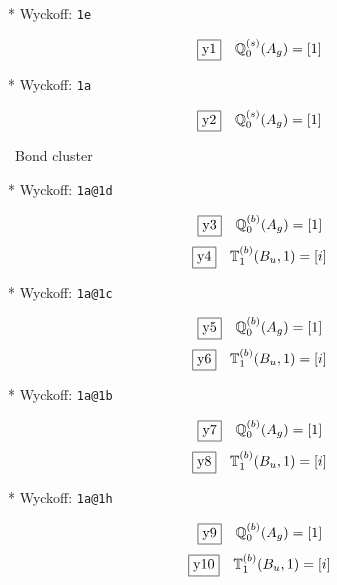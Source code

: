 \documentclass[fleqn,10pt,landscape]{jsarticle}
\begin{document}
\noindent ** Wyckoff: \texttt{1e}

\begin{dmath*}
\fbox{y1}\quad \mathbb{Q}_{0}^{(s)}(A_{g})=\left[ 1 \right]
\end{dmath*}
\vspace{5mm}

\noindent ** Wyckoff: \texttt{1a}

\begin{dmath*}
\fbox{y2}\quad \mathbb{Q}_{0}^{(s)}(A_{g})=\left[ 1 \right]
\end{dmath*}
\vspace{5mm}

\noindent\textbullet\, Bond cluster

\vspace{5mm}

\noindent ** Wyckoff: \texttt{1a@1d}

\begin{dmath*}
\fbox{y3}\quad \mathbb{Q}_{0}^{(b)}(A_{g})=\left[ 1 \right]
\end{dmath*}
\begin{dmath*}
\fbox{y4}\quad \mathbb{T}_{1}^{(b)}(B_{u},1)=\left[ i \right]
\end{dmath*}
\vspace{5mm}

\noindent ** Wyckoff: \texttt{1a@1c}

\begin{dmath*}
\fbox{y5}\quad \mathbb{Q}_{0}^{(b)}(A_{g})=\left[ 1 \right]
\end{dmath*}
\begin{dmath*}
\fbox{y6}\quad \mathbb{T}_{1}^{(b)}(B_{u},1)=\left[ i \right]
\end{dmath*}
\vspace{5mm}

\noindent ** Wyckoff: \texttt{1a@1b}

\begin{dmath*}
\fbox{y7}\quad \mathbb{Q}_{0}^{(b)}(A_{g})=\left[ 1 \right]
\end{dmath*}
\begin{dmath*}
\fbox{y8}\quad \mathbb{T}_{1}^{(b)}(B_{u},1)=\left[ i \right]
\end{dmath*}
\vspace{5mm}

\noindent ** Wyckoff: \texttt{1a@1h}

\begin{dmath*}
\fbox{y9}\quad \mathbb{Q}_{0}^{(b)}(A_{g})=\left[ 1 \right]
\end{dmath*}
\begin{dmath*}
\fbox{y10}\quad \mathbb{T}_{1}^{(b)}(B_{u},1)=\left[ i \right]
\end{dmath*}
\vspace{5mm}
\end{document}
